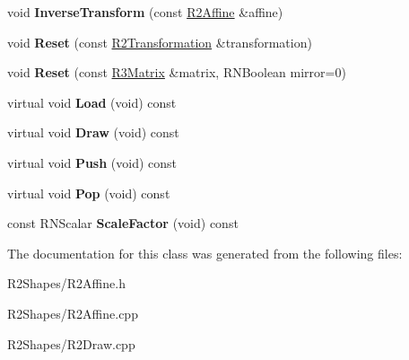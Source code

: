 \begin{DoxyCompactItemize}
\item 
void {\bfseries Inverse\+Transform} (const \hyperlink{class_r2_affine}{R2\+Affine} \&affine)\hypertarget{class_r2_affine_ae94abc9cbe6875f452e3f604aa95d8af}{}\label{class_r2_affine_ae94abc9cbe6875f452e3f604aa95d8af}

\item 
void {\bfseries Reset} (const \hyperlink{class_r2_transformation}{R2\+Transformation} \&transformation)\hypertarget{class_r2_affine_ac1efebf9997cc0b74d0c81ce71532d95}{}\label{class_r2_affine_ac1efebf9997cc0b74d0c81ce71532d95}

\item 
void {\bfseries Reset} (const \hyperlink{class_r3_matrix}{R3\+Matrix} \&matrix, R\+N\+Boolean mirror=0)\hypertarget{class_r2_affine_a921a4e00c19cb12a03cf68f10f59b4a5}{}\label{class_r2_affine_a921a4e00c19cb12a03cf68f10f59b4a5}

\item 
virtual void {\bfseries Load} (void) const \hypertarget{class_r2_affine_a19432114bc764f7e8f5d1760c4d64086}{}\label{class_r2_affine_a19432114bc764f7e8f5d1760c4d64086}

\item 
virtual void {\bfseries Draw} (void) const \hypertarget{class_r2_affine_a04ed63532964524b986fbdc3a1e94c48}{}\label{class_r2_affine_a04ed63532964524b986fbdc3a1e94c48}

\item 
virtual void {\bfseries Push} (void) const \hypertarget{class_r2_affine_ad3125cf5dd10887394ab1efdacc3028c}{}\label{class_r2_affine_ad3125cf5dd10887394ab1efdacc3028c}

\item 
virtual void {\bfseries Pop} (void) const \hypertarget{class_r2_affine_adcf72df4a772d2fa94065252af9c76d3}{}\label{class_r2_affine_adcf72df4a772d2fa94065252af9c76d3}

\item 
const R\+N\+Scalar {\bfseries Scale\+Factor} (void) const \hypertarget{class_r2_affine_af76ac8f0f85c269630fa577f33466bbb}{}\label{class_r2_affine_af76ac8f0f85c269630fa577f33466bbb}

\end{DoxyCompactItemize}


The documentation for this class was generated from the following files\+:\begin{DoxyCompactItemize}
\item 
R2\+Shapes/R2\+Affine.\+h\item 
R2\+Shapes/R2\+Affine.\+cpp\item 
R2\+Shapes/R2\+Draw.\+cpp\end{DoxyCompactItemize}
